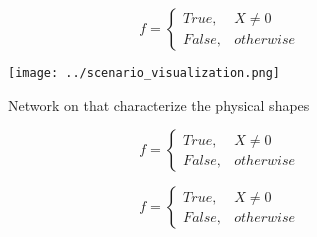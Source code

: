 \documentclass[a4paper]{article}
\begin{document}
\begin{equation}   f =
\begin{cases} True, & X \neq 0\\
False, & otherwise
\end{cases}
\end{equation}

\begin{figure}
\centering
\texttt{[image: ../scenario\_visualization.png]}
\caption{Network on that characterize the physical shapes 
}
\end{figure}
 
\begin{equation}   f =
\begin{cases} True, & X \neq 0\\
False, & otherwise
\end{cases}
\end{equation}

\begin{equation}   f =
\begin{cases} True, & X \neq 0\\
False, & otherwise
\end{cases}
\end{equation}
\end{document}
